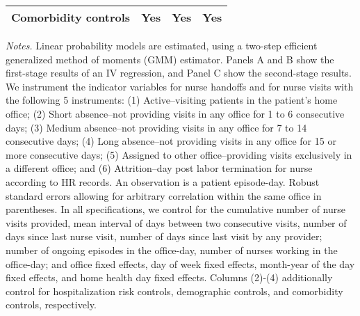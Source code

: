 \documentclass[final,12pt, notitlepage]{article}
\begin{document}
\begin{singlespace}
\begin{table}[H]
\begin{threeparttable}
{\begin{tabular*}{\textwidth}{l@{\extracolsep{\fill}}*{3}{c}}
 Comorbidity controls & Yes & Yes & Yes \\
\bottomrule
\end{tabular*}
}
	\begin{tablenotes}
	\scriptsize
	\item \emph{Notes.}  Linear probability models are estimated, using a two-step efficient generalized method of moments (GMM) estimator.
	Panels A and B show the first-stage results of an IV regression, and Panel C show the second-stage results.
	We instrument the indicator variables for nurse handoffs and for nurse visits with the following 5 instruments:
(1) Active--visiting patients in the patient's home office;
(2) Short absence--not providing visits in any office for 1 to 6 consecutive days;
(3) Medium absence--not providing visits in any office for 7 to 14 consecutive days;
(4) Long absence--not providing visits in any office for 15 or more consecutive days;
(5) Assigned to other office--providing visits exclusively in a different office; and
(6) Attrition--day post labor termination for nurse according to HR records.
	An observation is a patient episode-day.
	Robust standard errors allowing for arbitrary correlation within the same office in parentheses.
		In all specifications, we control for the cumulative number of nurse visits provided, mean interval of days between two consecutive visits, number of days since last nurse visit, number of days since last visit by any provider; number of ongoing episodes in the office-day, number of nurses working in the office-day; and office fixed effects, day of week fixed effects, month-year of the day fixed effects, and home health day fixed effects.
	Columns (2)-(4) additionally control for hospitalization risk controls, demographic controls, and comorbidity controls, respectively.

\end{tablenotes}
\end{threeparttable}
\end{table}
\end{singlespace}
\end{document}
